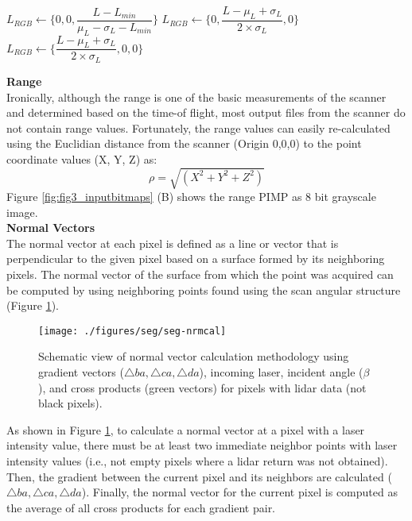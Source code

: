 \documentclass[final,3p,times,twocolumn,authoryear]{elsarticle}
\begin{document}
\begin{algorithmic}
	\State $L_{RGB} \gets \lbrace 0,0,\dfrac{L-L_{min}}{\mu_L - \sigma_L-L_{min}} \rbrace$
	\State $L_{RGB} \gets \lbrace 0,\dfrac{L-\mu_L + \sigma_L}{2 \times \sigma_L},0\rbrace$
	\Else 
	\State $L_{RGB} \gets \lbrace \dfrac{L-\mu_L + \sigma_L}{2 \times \sigma_L},0,0 \rbrace $
	\EndIf
\end{algorithmic}

\noindent \textbf{Range}\\
\indent Ironically, although the range is one of the basic measurements of the scanner and determined based on the time-of flight, most output files from the scanner do not contain range values. Fortunately, the range values can easily re-calculated using the Euclidian distance from the scanner (Origin 0,0,0) to the point coordinate values (X, Y, Z) as:
\begin{equation}
\rho = \sqrt{(X^2+Y^2+Z^2)}
\end{equation}
\noindent Figure \ref{fig:fig3_inputbitmaps} (B) shows the range PIMP as 8 bit grayscale image.\\ 

\noindent \textbf{Normal Vectors}\\
\indent The normal vector at each pixel is defined as a line or vector that is perpendicular to the given pixel based on a surface formed by its neighboring pixels. The normal vector of the surface from which the point was acquired can be computed by using neighboring points found using the scan angular structure (Figure \ref{fig:seg-nrmcal}). 

\begin{figure}[h]
	\centering
	\texttt{[image: ./figures/seg/seg-nrmcal]}
	\caption{Schematic view of normal vector calculation methodology using gradient vectors ($\bigtriangleup ba, \bigtriangleup ca, \bigtriangleup da$), incoming laser, incident angle ($\beta$), and cross products (green vectors) for pixels with lidar data (not black pixels).}
	\label{fig:seg-nrmcal}
\end{figure}


As shown in Figure \ref{fig:seg-nrmcal}, to calculate a normal vector at a pixel with a laser intensity value, there must be at least two immediate neighbor points with laser intensity values (i.e., not empty pixels where a lidar return was not obtained). Then, the gradient  between the current pixel and its neighbors are calculated ($\bigtriangleup ba, \bigtriangleup ca, \bigtriangleup da$). Finally, the normal vector for the current pixel is computed as the average of all cross products for each gradient pair. 
\end{document}
